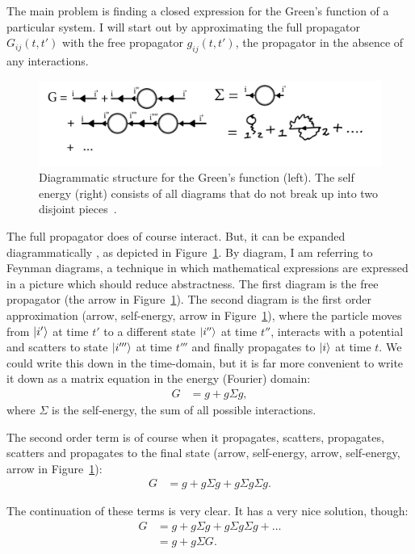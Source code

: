 The main problem is finding a closed expression for the Green's function of a particular system. I will start out by approximating the full propagator $G_{ij}(t,t')$ with the free propagator $g_{ij}(t,t')$, the propagator in the absence of any interactions. 

\begin{figure}[!bt]
    \centering
    \includegraphics[width=\textwidth]{pdf/diagrams.pdf}
    \caption{Diagrammatic structure for the Green's function (left). The self energy (right) consists of all diagrams that do not break up into two disjoint pieces~\cite{leeuwen}.}
    \label{fig:firstorderdiagram}
\end{figure}
The full propagator does of course interact. But, it can be expanded diagrammatically \cite{mattuck}, as depicted in Figure~\ref{fig:firstorderdiagram}. By diagram, I am referring to Feynman diagrams, a technique in which mathematical expressions are expressed in a picture which should reduce abstractness. The first diagram is the free propagator (the arrow in Figure~\ref{fig:firstorderdiagram}). The second diagram is the first order approximation (arrow, self-energy, arrow in Figure~\ref{fig:firstorderdiagram}), where the particle moves from $\ket{i'}$ at time $t'$ to a different state $\ket{i''}$ at time $t''$, interacts with a potential and scatters to state $\ket{i'''}$ at time $t'''$ and finally propagates to $\ket{i}$ at time $t$. We could write this down in the time-domain, but it is far more convenient to write it down as a matrix equation in the energy (Fourier) domain:
\begin{align*}
G &= g + g \Sigma g,
\end{align*}
where $\Sigma$ is the self-energy, the sum of all possible interactions.

The second order term is of course when it propagates, scatters, propagates, scatters and propagates to the final state (arrow, self-energy, arrow, self-energy, arrow in Figure~\ref{fig:firstorderdiagram}):
\begin{align*}
G &= g + g \Sigma g + g \Sigma g \Sigma g.
\end{align*}

The continuation of these terms is very clear. It has a very nice solution, though:
\begin{align}
G &= g + g \Sigma g + g \Sigma g \Sigma g+ \ldots \nonumber\\
&= g + g \Sigma G. \label{eq:dyson}
\end{align}

